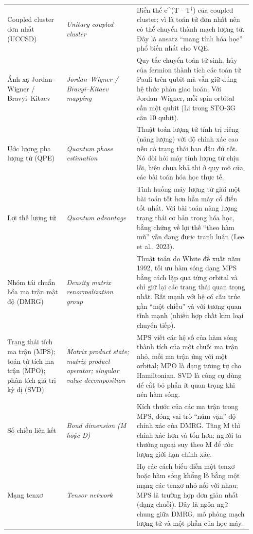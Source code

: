 \begin{longtable}{@{}>{\raggedright\arraybackslash}p{}>{\raggedright\arraybackslash\itshape}p{}>{\raggedright\arraybackslash}p{}@{}}
Coupled cluster đơn nhất (UCCSD) & Unitary coupled cluster & Biến thể e\textasciicircum{}(T - T$^\dagger$) của coupled cluster; vì là toán tử đơn nhất nên có thể chuyển thành mạch lượng tử. Đây là ansatz ``mang tính hóa học'' phổ biến nhất cho VQE. \\[2pt]
Ánh xạ Jordan–Wigner / Bravyi–Kitaev & Jordan–Wigner / Bravyi–Kitaev mapping & Quy tắc chuyển toán tử sinh, hủy của fermion thành tích các toán tử Pauli trên qubit mà vẫn giữ đúng hệ thức phản giao hoán. Với Jordan–Wigner, mỗi spin-orbital cần một qubit (Li trong STO-3G cần 10 qubit). \\[2pt]
Ước lượng pha lượng tử (QPE) & Quantum phase estimation & Thuật toán lượng tử tính trị riêng (năng lượng) với độ chính xác cao nếu có trạng thái ban đầu đủ tốt. Nó đòi hỏi máy tính lượng tử chịu lỗi, hiện chưa khả thi ở quy mô của các bài toán hóa học thực tế. \\[2pt]
Lợi thế lượng tử & Quantum advantage & Tình huống máy lượng tử giải một bài toán tốt hơn hẳn máy cổ điển tốt nhất. Với bài toán năng lượng trạng thái cơ bản trong hóa học, bằng chứng về lợi thế ``theo hàm mũ'' vẫn đang được tranh luận (Lee et al., 2023). \\[2pt]
Nhóm tái chuẩn hóa ma trận mật độ (DMRG) & Density matrix renormalization group & Thuật toán do White đề xuất năm 1992, tối ưu hàm sóng dạng MPS bằng cách lặp qua từng orbital và chỉ giữ lại các trạng thái quan trọng nhất. Rất mạnh với hệ có cấu trúc gần ``một chiều'' và với tương quan tĩnh mạnh (nhiều hợp chất kim loại chuyển tiếp). \\[2pt]
Trạng thái tích ma trận (MPS); toán tử tích ma trận (MPO); phân tích giá trị kỳ dị (SVD) & Matrix product state; matrix product operator; singular value decomposition & MPS viết các hệ số của hàm sóng thành tích của một chuỗi ma trận nhỏ, mỗi ma trận ứng với một orbital; MPO là dạng tương tự cho Hamiltonian. SVD là công cụ dùng để cắt bỏ phần ít quan trọng khi nén hàm sóng. \\[2pt]
Số chiều liên kết & Bond dimension (M hoặc D) & Kích thước của các ma trận trong MPS, đóng vai trò ``núm vặn'' độ chính xác của DMRG. Tăng M thì chính xác hơn và tốn hơn; người ta thường ngoại suy theo M để ước lượng giới hạn chính xác. \\[2pt]
Mạng tenxơ & Tensor network & Họ các cách biểu diễn một tenxơ hoặc hàm sóng khổng lồ bằng một mạng các tenxơ nhỏ nối với nhau; MPS là trường hợp đơn giản nhất (dạng chuỗi). Đây là ngôn ngữ chung giữa DMRG, mô phỏng mạch lượng tử và một phần của học máy. \\[2pt]
\bottomrule\end{longtable}
